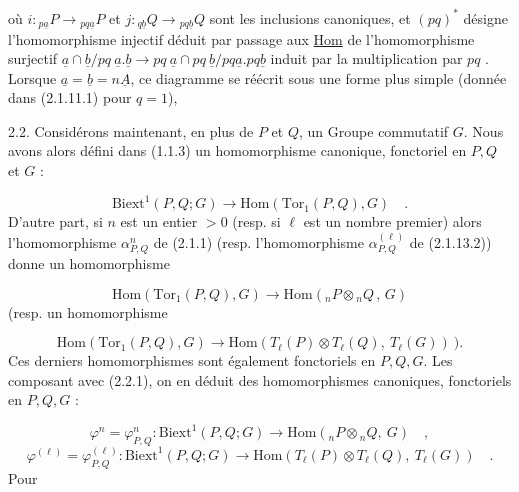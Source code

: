 où $i : {}_{p\underline{a}}P \longrightarrow {}_{pq\underline{a}}P$ et $j : {}_{q\underline{b}}Q \longrightarrow {}_{pq\underline{b}}Q$ sont les inclusions canoniques, et $(pq)^{*}$ désigne l'homomorphisme injectif déduit par passage aux \underline{Hom} de l'homomorphisme surjectif $\underline{a}\cap\underline{b}/pq\ \underline{a}.\underline{b} \longrightarrow pq\ \underline{a}\cap pq\ \underline{b}/pq\underline{a}.pq\underline{b}$ induit par la multiplication par $pq$ . Lorsque $\underline{a} = \underline{b} = n\underline{A}$, ce diagramme se réécrit sous une forme plus simple (donnée dans (2.1.11.1) pour $q = 1$),

2.2. Considérons maintenant, en plus de $P$ et $Q$, un Groupe commutatif $G$. Nous avons alors défini dans (1.1.3) un homomorphisme canonique, fonctoriel en $P,Q$ et $G$ :

\begin{equation}\tag{2.2.1}
\mathrm{Biext}^1(P,Q;G) \longrightarrow \mathrm{Hom}(\mathrm{Tor}_1(P,Q),G) \quad .
\end{equation}
D'autre part, si $n$ est un entier $> 0$ (resp. si $\ell$ est un nombre premier) alors l'homomorphisme $\alpha^n_{P,Q}$ de (2.1.1) (resp. l'homomorphisme $\alpha^{(\ell)}_{P,Q}$ de (2.1.13.2)) donne un homomorphisme

\begin{equation*}
\mathrm{Hom}(\mathrm{Tor}_1(P,Q),G) \longrightarrow \mathrm{Hom}({}_nP \otimes {}_nQ \, , \, G)
\end{equation*}
(resp. un homomorphisme

\begin{equation*}
\mathrm{Hom}(\mathrm{Tor}_1(P,Q),G) \longrightarrow \mathrm{Hom}(T_{\ell}(P) \otimes T_{\ell}(Q), \ T_{\ell}(G)) \ ).
\end{equation*}
Ces derniers homomorphismes sont également fonctoriels en $P,Q,G$. Les composant avec (2.2.1), on en déduit des homomorphismes canoniques, fonctoriels en $P,Q,G$ :

\begin{equation}\tag{2.2.2}
\varphi^n = \varphi^n_{P,Q} : \mathrm{Biext}^1(P,Q;G) \longrightarrow \mathrm{Hom}({}_nP{\otimes}{}_nQ, \ G) \quad ,
\end{equation}
\begin{equation}\tag{2.2.3}
\varphi^{(\ell)} = \varphi^{(\ell)}_{P,Q} : \mathrm{Biext}^1(P,Q;G) \longrightarrow \mathrm{Hom}(T_{\ell}(P){\otimes}T_{\ell}(Q), \ T_{\ell}(G)) \quad .
\end{equation}
Pour

